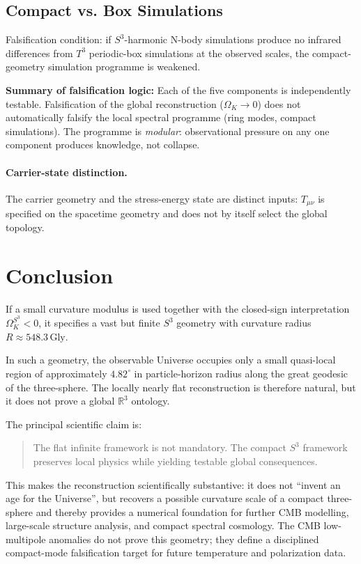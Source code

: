 \documentclass[aps,prd,onecolumn,superscriptaddress,longbibliography,nofootinbib,notitlepage]{revtex4-2}
\newcommand{\Gly}{\,\mathrm{Gly}}
\begin{document}
\subsection{Compact vs. Box Simulations}

Falsification condition: if $S^3$-harmonic N-body simulations produce no
infrared differences from $T^3$ periodic-box simulations at the observed scales,
the compact-geometry simulation programme is weakened.

\medskip
\noindent\textbf{Summary of falsification logic:} Each of the five components
is independently testable. Falsification of the global reconstruction
($\Omega_K \to 0$) does not automatically falsify the local spectral programme
(ring modes, compact simulations). The programme is \emph{modular}: observational
pressure on any one component produces knowledge, not collapse.


\paragraph*{Carrier-state distinction.}
The carrier geometry and the stress-energy state are distinct inputs: $T_{\mu\nu}$ is
specified on the spacetime geometry and does not by itself select the global topology.

\section{Conclusion}
\label{sec:conclusion}

If a small curvature modulus is used together with the closed-sign interpretation
$\Omega_K^{S^3}<0$, it specifies a vast but finite $S^3$ geometry with curvature
radius $R \approx 548.3\Gly$.

In such a geometry, the observable Universe occupies only a small quasi-local
region of approximately $4.82^\circ$ in particle-horizon radius along the great
geodesic of the three-sphere. The locally nearly flat reconstruction is therefore
natural, but it does not prove a global $\mathbb{R}^3$ ontology.

The principal scientific claim is:
\begin{quote}
The flat infinite framework is not mandatory. The compact $S^3$ framework
preserves local physics while yielding testable global consequences.
\end{quote}

This makes the reconstruction scientifically substantive: it does not ``invent an
age for the Universe'', but recovers a possible curvature scale of a compact
three-sphere and thereby provides a numerical foundation for further CMB modelling,
large-scale structure analysis, and compact spectral cosmology. The CMB
low-multipole anomalies do not prove this geometry; they define a disciplined
compact-mode falsification target for future temperature and polarization data.
\end{document}
